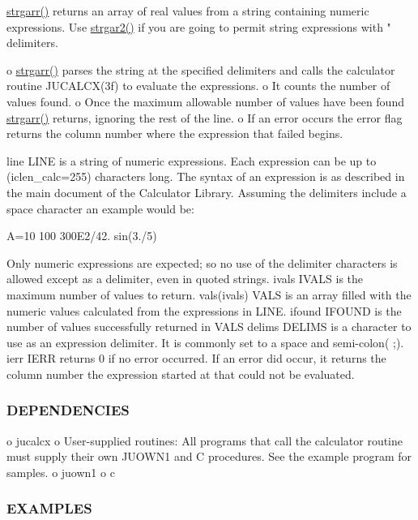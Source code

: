 \hyperlink{namespacem__calculator__plus_a4d3424e0cb74d4af53e7f59c07d31f1b}{strgarr()} returns an array of real values from a string containing numeric expressions. Use \hyperlink{namespacem__calculator__plus_a59710eb6babeed1f4b8d439f97d5d90a}{strgar2()} if you are going to permit string expressions with " delimiters.

o \hyperlink{namespacem__calculator__plus_a4d3424e0cb74d4af53e7f59c07d31f1b}{strgarr()} parses the string at the specified delimiters and calls the calculator routine J\+U\+C\+A\+L\+C\+X(3f) to evaluate the expressions. o It counts the number of values found. o Once the maximum allowable number of values have been found \hyperlink{namespacem__calculator__plus_a4d3424e0cb74d4af53e7f59c07d31f1b}{strgarr()} returns, ignoring the rest of the line. o If an error occurs the error flag returns the column number where the expression that failed begins.

line L\+I\+NE is a string of numeric expressions. Each expression can be up to (iclen\+\_\+calc=255) characters long. The syntax of an expression is as described in the main document of the Calculator Library. Assuming the delimiters include a space character an example would be\+:

\textquotesingle{}A=10 100 300\+E2/42. sin(3./5)\textquotesingle{}

Only numeric expressions are expected; so no use of the delimiter characters is allowed except as a delimiter, even in quoted strings. ivals I\+V\+A\+LS is the maximum number of values to return. vals(ivals) V\+A\+LS is an array filled with the numeric values calculated from the expressions in L\+I\+NE. ifound I\+F\+O\+U\+ND is the number of values successfully returned in V\+A\+LS delims D\+E\+L\+I\+MS is a character to use as an expression delimiter. It is commonly set to a space and semi-\/colon(\textquotesingle{} ;\textquotesingle{}). ierr I\+E\+RR returns 0 if no error occurred. If an error did occur, it returns the column number the expression started at that could not be evaluated.

\subsubsection*{D\+E\+P\+E\+N\+D\+E\+N\+C\+I\+ES}

o jucalcx o User-\/supplied routines\+: All programs that call the calculator routine must supply their own J\+U\+O\+W\+N1 and C procedures. See the example program for samples. o juown1 o c \subsubsection*{E\+X\+A\+M\+P\+L\+ES}

